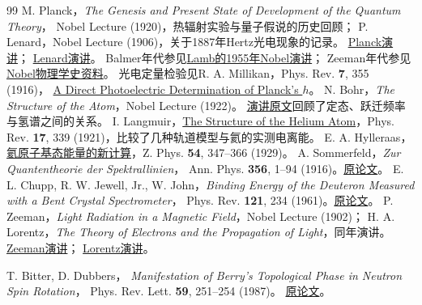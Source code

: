 \begin{thebibliography}{99}
    M. Planck，\textit{The Genesis and Present State of Development of the Quantum Theory}，
    Nobel Lecture (1920)，热辐射实验与量子假说的历史回顾；
    P. Lenard，Nobel Lecture (1906)，关于1887年Hertz光电现象的记录。
    \href{https://www.nobelprize.org/prizes/physics/1918/planck/lecture/}{Planck演讲}；
    \href{https://www.nobelprize.org/uploads/2017/07/lenard-lecture2.pdf}{Lenard演讲}。
    Balmer年代参见\href{https://www.nobelprize.org/uploads/2018/06/lamb-lecture.pdf}{Lamb的1955年Nobel演讲}；
    Zeeman年代参见\href{https://www.nobelprize.org/prizes/themes/the-nobel-prize-in-physics-1901-2000/}{Nobel物理学史资料}。
    光电定量检验见R. A. Millikan，Phys. Rev. \textbf{7}, 355 (1916)，
    \href{https://doi.org/10.1103/PhysRev.7.355}{A Direct Photoelectric Determination of Planck's $h$}。
    N. Bohr，\textit{The Structure of the Atom}，Nobel Lecture (1922)。
    \href{https://www.nobelprize.org/uploads/2018/06/bohr-lecture.pdf}{演讲原文}回顾了定态、跃迁频率与氢谱之间的关系。
    I. Langmuir，\href{https://doi.org/10.1103/PhysRev.17.339}{The Structure of the Helium Atom}，Phys. Rev. \textbf{17}, 339 (1921)，比较了几种轨道模型与氦的实测电离能。
    E. A. Hylleraas，\href{https://doi.org/10.1007/BF01375457}{氦原子基态能量的新计算}，Z. Phys. \textbf{54}, 347--366 (1929)。
    A. Sommerfeld，\textit{Zur Quantentheorie der Spektrallinien}，
    Ann. Phys. \textbf{356}, 1--94 (1916)。\href{https://doi.org/10.1002/andp.19163561702}{原论文}。
    E. L. Chupp, R. W. Jewell, Jr., W. John，\textit{Binding Energy of the Deuteron Measured with a Bent Crystal Spectrometer}，
    Phys. Rev. \textbf{121}, 234 (1961)。\href{https://doi.org/10.1103/PhysRev.121.234}{原论文}。
    P. Zeeman，\textit{Light Radiation in a Magnetic Field}，Nobel Lecture (1902)；
    H. A. Lorentz，\textit{The Theory of Electrons and the Propagation of Light}，同年演讲。
    \href{https://www.nobelprize.org/prizes/physics/1902/zeeman/lecture/}{Zeeman演讲}；
    \href{https://www.nobelprize.org/prizes/physics/1902/lorentz/lecture/}{Lorentz演讲}。

    T. Bitter, D. Dubbers，
    \textit{Manifestation of Berry's Topological Phase in Neutron Spin Rotation}，
    Phys. Rev. Lett. \textbf{59}, 251--254 (1987)。
    \href{https://doi.org/10.1103/PhysRevLett.59.251}{原论文}。


\end{thebibliography}
